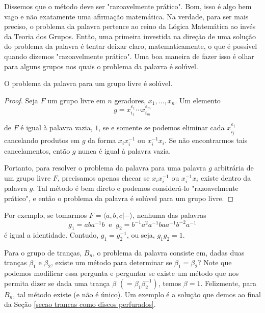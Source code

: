 	\par\vspace{0.3cm} Dissemos que o método deve ser "razoavelmente prático". Bom, isso é algo bem vago e não exatamente uma afirmação matemática. Na verdade, para ser mais preciso, o problema da palavra pertence ao reino da Lógica Matemática ao invés da Teoria dos Grupos. Então, uma primeira investida na direção de uma solução do problema da palavra é tentar deixar claro, matematicamente, o que é possível quando dizemos "razoavelmente prático". Uma boa maneira de fazer isso é olhar para alguns grupos nos quais o problema da palavra é solúvel.
	\begin{theorem}
		\label{problema da palavra soluvel para grupos livres}
		O problema da palavra para um grupo livre é solúvel.
	\end{theorem}
	\begin{proof}
		Seja $F$ um grupo livre em $n$ geradores, $x_1, \dots, x_n$. Um elemento 
		\begin{equation*}
		g = x_{i_1}^{\varepsilon_1}\cdots x_{i_m}^{\varepsilon_m}
		\end{equation*}
		\par\vspace{0.3cm} de $F$ é igual à palavra vazia, $1$, se e somente se podemos eliminar cada $x_{i_j}^{\varepsilon_j}$ cancelando produtos em $g$ da forma $x_ix_i^{-1}$ ou $x_i^{-1}x_i$. Se não encontrarmos tais cancelamentos, então $g$ nunca é igual à palavra vazia.
		\par\vspace{0.3cm} Portanto, para resolver o problema da palavra para uma palavra $g$ arbitrária de um grupo livre $F$, precisamos apenas checar se $x_ix_i^{-1}$ ou $x_i^{-1}x_i$ existe dentro da palavra $g$. Tal método é bem direto e podemos considerá-lo "razoavelmente prático", e então o problema da palavra é solúvel para um grupo livre. 
	\end{proof}
	\par\vspace{0.3cm} Por exemplo, se tomarmos $F = \langle a,b,c|- \rangle$, nenhuma das palavras 
	\begin{equation*}
	g_1 = aba^{-1}b \ \text{ e } \ g_2 = b^{-1}a^2a^{-1}baa^{-1}b^{-2}a^{-1}
	\end{equation*}
	é igual a identidade. Contudo, $g_1 = g_2^{-1}$, ou seja, $g_1g_2 = 1$.
	\par\vspace{0.3cm} Para o grupo de tranças, $B_n$, o problema da palavra consiste em, dadas duas tranças $\beta_1$ e $\beta_2$, existe um método para determinar se $\beta_1 = \beta_2$? Note que podemos modificar essa pergunta e perguntar se existe um método que nos permita dizer se dada uma trança $\beta$ $(=\beta_1\beta_2^{-1})$, temos $\beta = 1$. Felizmente, para $B_n$, tal método existe (e não é único). Um exemplo é a solução que demos ao final da Seção \eqref{secao trancas como discos perfurados}.
	
